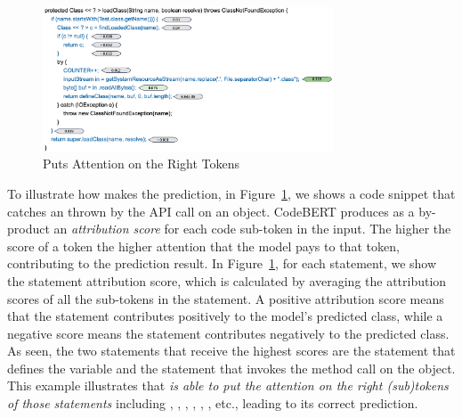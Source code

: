 \begin{figure}[t]
 	\centering
 	\includegraphics[width=3.4in]{rq1-case-study.png}
        \vspace{-20pt}
 	\caption{{\xblock} Puts Attention on the Right Tokens}
 	\label{fig:rq1-case}	
\end{figure}

 To illustrate how {\xblock} makes
the prediction, in Figure~\ref{fig:rq1-case}, we shows a code snippet
that catches an  thrown by the 
API call on an  object. CodeBERT produces as a
by-product an {\em attribution score} for each code sub-token in the
input. The higher the score of a token the higher attention that the
model pays to that token, contributing to the prediction result. In
Figure~\ref{fig:rq1-case}, for each statement, we show the statement
attribution score, which is calculated by averaging the attribution
scores of all the sub-tokens in the statement.
%
A positive attribution score means that the statement contributes
positively to the model's predicted class, while a negative score
means the statement contributes negatively to the predicted class.  As
seen, the two statements that receive the highest scores are the
statement that defines the  variable and the
statement that invokes the  method call on the
 object. This example illustrates that {\em {\tool} is
able to put the attention on the right (sub)tokens of those statements}
including , , , ,
, , etc., leading to its correct prediction.

